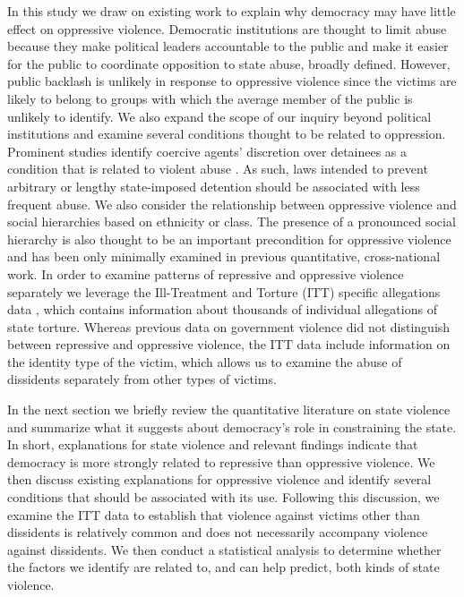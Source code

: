 \documentclass[11pt]{article}
\begin{document}
In this study we draw on existing work to explain why democracy may have little effect on oppressive violence. Democratic institutions are thought to limit abuse because they make political leaders accountable to the public and make it easier for the public to coordinate opposition to state abuse, broadly defined. However, public backlash is unlikely in response to oppressive violence since the victims are likely to belong to groups with which the average member of the public is unlikely to identify. We also expand the scope of our inquiry beyond political institutions and examine several conditions thought to be related to oppression. Prominent studies identify coercive agents' discretion over detainees as a condition that is related to violent abuse \citep{Rejali2007,ConradMoore2010}. As such, laws intended to prevent arbitrary or lengthy state-imposed detention should be associated with less frequent abuse. We also consider the relationship between oppressive violence and social hierarchies based on ethnicity or class. The presence of a pronounced social hierarchy is also thought to be an important precondition for oppressive violence \citep{Rejali2007} and has been only minimally examined in previous quantitative, cross-national work. In order to examine patterns of repressive and oppressive violence separately we leverage the Ill-Treatment and Torture (ITT) specific allegations data \citep{ConradHaglundMoore2014}, which contains information about thousands of individual allegations of state torture. Whereas previous data on government violence did not distinguish between repressive and oppressive violence, the ITT data include information on the identity type of the victim, which allows us to examine the abuse of dissidents separately from other types of victims. 

In the next section we briefly review the quantitative literature on state violence and summarize what it suggests about democracy's role in constraining the state. In short, explanations for state violence and relevant findings indicate that democracy is more strongly related to repressive than oppressive violence. We then discuss existing explanations for oppressive violence and identify several conditions that should be associated with its use. Following this discussion, we examine the ITT data to establish that violence against victims other than dissidents is relatively common and does not necessarily accompany violence against dissidents. We then conduct a statistical analysis to determine whether the factors we identify are related to, and can help predict, both kinds of state violence.  
\end{document}
